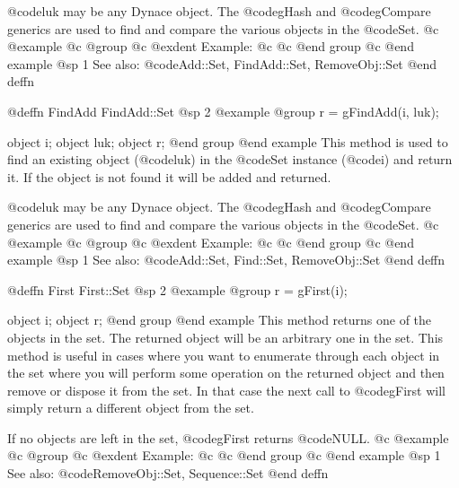 @code{luk} may be any Dynace object.  The @code{gHash} and
@code{gCompare} generics are used to find and compare the various
objects in the @code{Set}.
@c @example
@c @group
@c @exdent Example:
@c 
@c @end group
@c @end example
@sp 1
See also:  @code{Add::Set, FindAdd::Set, RemoveObj::Set}
@end deffn










@deffn {FindAdd} FindAdd::Set
@sp 2
@example
@group
r = gFindAdd(i, luk);

object  i;
object  luk;
object  r;
@end group
@end example
This method is used to find an existing object (@code{luk}) in the @code{Set}
instance (@code{i}) and return it.  If the object is not found it will
be added and returned.  

@code{luk} may be any Dynace object.  The @code{gHash} and
@code{gCompare} generics are used to find and compare the various
objects in the @code{Set}.
@c @example
@c @group
@c @exdent Example:
@c 
@c @end group
@c @end example
@sp 1
See also:  @code{Add::Set, Find::Set, RemoveObj::Set}
@end deffn



















@deffn {First} First::Set
@sp 2
@example
@group
r = gFirst(i);

object  i;
object  r;
@end group
@end example
This method returns one of the objects in the set.  The returned
object will be an arbitrary one in the set.  This method is useful
in cases where you want to enumerate through each object in the
set where you will perform some operation on the returned object and
then remove or dispose it from the set.  In that case the next call
to @code{gFirst} will simply return a different object from the set.

If no objects are left in the set, @code{gFirst} returns @code{NULL}.
@c @example
@c @group
@c @exdent Example:
@c 
@c @end group
@c @end example
@sp 1
See also:  @code{RemoveObj::Set, Sequence::Set}
@end deffn















